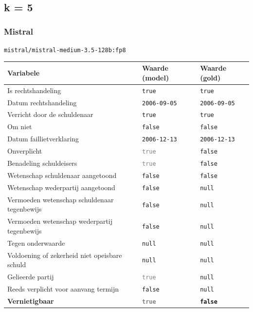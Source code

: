 \documentclass[
  dutch,
  a4paper,
]{article}
\begin{document}
\newpage


\subsection{k = 5}\label{k-5-8}

\subsubsection{Mistral}\label{mistral-25}

\texttt{mistral/mistral-medium-3.5-128b:fp8}

\begin{center}
\small
\begin{tabular}{@{}p{7.4cm}p{2.6cm}p{2.6cm}@{}}
\toprule
Variabele & Waarde (model) & Waarde (gold) \\
\midrule
Is rechtshandeling & \texttt{true} & \texttt{true} \\
Datum rechtshandeling & \texttt{2006-09-05} & \texttt{2006-09-05} \\
Verricht door de schuldenaar & \texttt{true} & \texttt{true} \\
Om niet & \texttt{false} & \texttt{false} \\
Datum faillietverklaring & \texttt{2006-12-13} & \texttt{2006-12-13} \\
Onverplicht & \textcolor{gray}{\texttt{true}} & \texttt{false} \\
Benadeling schuldeisers & \textcolor{gray}{\texttt{true}} & \texttt{false} \\
Wetenschap schuldenaar aangetoond & \texttt{false} & \texttt{false} \\
Wetenschap wederpartij aangetoond & \texttt{false} & \texttt{null} \\
Vermoeden wetenschap schuldenaar tegenbewijs & \texttt{false} & \texttt{null} \\
Vermoeden wetenschap wederpartij tegenbewijs & \texttt{false} & \texttt{null} \\
Tegen onderwaarde & \texttt{null} & \texttt{null} \\
Voldoening of zekerheid niet opeisbare schuld & \texttt{null} & \texttt{null} \\
Gelieerde partij & \textcolor{gray}{\texttt{true}} & \texttt{null} \\
Reeds verplicht voor aanvang termijn & \texttt{false} & \texttt{null} \\
\textbf{Vernietigbaar} & \textbf{\textcolor{gray}{\texttt{true}}} & \textbf{\texttt{false}} \\
\bottomrule
\end{tabular}
\end{center}
\end{document}
